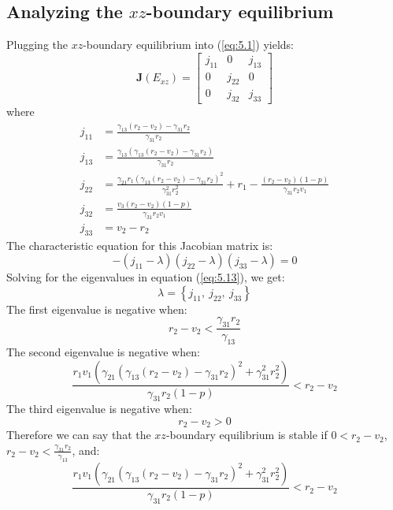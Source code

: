 \subsection{Analyzing the $xz$-boundary equilibrium}\label{subsec:stability_xz_boundary_equilibrium}
Plugging the $xz$-boundary equilibrium into (\ref{eq:5.1}) yields:
\begin{equation}
    \textbf{J}\left(E_{xz}\right)=\begin{bmatrix}
        j_{11} & 0 & j_{13}\\
        0 & j_{22} & 0\\
        0 & j_{32} & j_{33}
    \end{bmatrix}
    \label{eq:5.12}
\end{equation}
where
\begin{align*}
    j_{11} &= \frac{\gamma_{13}\left(r_2-v_2\right)-\gamma_{31}r_2}{\gamma_{31}r_2}\\
    j_{13} &= \frac{\gamma_{13}\left(\gamma_{13}\left(r_2-v_2\right)-\gamma_{31}r_2\right)}{\gamma_{31}r_2}\\
    j_{22} &= \frac{\gamma_{21}r_1\left(\gamma_{13}\left(r_2-v_2\right)-\gamma_{31}r_2\right)^2}{\gamma_{31}^2r_2^2}+r_1-\frac{\left(r_2-v_2\right)\left(1-p\right)}{\gamma_{31}r_2v_1}\\
    j_{32} &= \frac{v_3\left(r_2-v_2\right)\left(1-p\right)}{\gamma_{31}r_2v_1}\\
    j_{33} &= v_2-r_2
\end{align*}
The characteristic equation for this Jacobian matrix is:
\begin{equation}
    -\left(j_{11}-\lambda\right)\left(j_{22}-\lambda\right)\left(j_{33}-\lambda\right)=0
    \label{eq:5.13}
\end{equation}
Solving for the eigenvalues in equation (\ref{eq:5.13}), we get:
\[
\lambda=\left\{
j_{11},\ 
j_{22},\ 
j_{33}
\right\}
\]
The first eigenvalue is negative when:
\[
r_2-v_2<\frac{\gamma_{31}r_2}{\gamma_{13}}
\]
The second eigenvalue is negative when:
\[
\frac{r_1v_1\left(\gamma_{21}\left(\gamma_{13}\left(r_2-v_2\right)-\gamma_{31}r_2\right)^2+\gamma_{31}^2r_2^2\right)}{\gamma_{31}r_2\left(1-p\right)}<r_2-v_2
\]
The third eigenvalue is negative when:
\[
r_2-v_2>0
\]
Therefore we can say that the $xz$-boundary equilibrium is stable if $0<r_2-v_2$, $\displaystyle r_2-v_2<\frac{\gamma_{31}r_2}{\gamma_{13}}$, and:
\[
\frac{r_1v_1\left(\gamma_{21}\left(\gamma_{13}\left(r_2-v_2\right)-\gamma_{31}r_2\right)^2+\gamma_{31}^2r_2^2\right)}{\gamma_{31}r_2\left(1-p\right)}<r_2-v_2
\]

